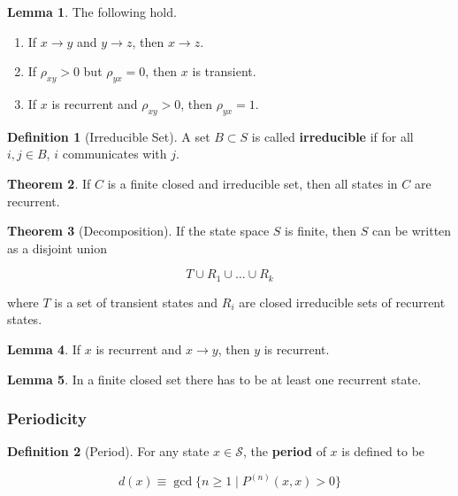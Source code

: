 \documentclass{article}
\theoremstyle{definition}
\newtheorem{theorem}{Theorem}[section]
\newtheorem{lemma}[theorem]{Lemma}
\theoremstyle{remark}
\theoremstyle{definition}
\newtheorem{definition}{Definition}[section]
\begin{document}
      \begin{lemma}
        The following hold. 

        \begin{enumerate}
          \item If $x \rightarrow y$ and $y \rightarrow z$, then $x \rightarrow z$. 
          \item If $\rho_{xy} > 0$ but $\rho_{yx} = 0$, then $x$ is transient.  
          \item If $x$ is recurrent and $\rho_{xy} > 0$, then $\rho_{yx} = 1$. 
        \end{enumerate}
      \end{lemma}

      \begin{definition}[Irreducible Set]
        A set $B \subset S$ is called \textbf{irreducible} if for all $i, j \in B$, $i$ communicates with $j$. 
      \end{definition}

      \begin{theorem}
        If $C$ is a finite closed and irreducible set, then all states in $C$ are recurrent. 
      \end{theorem}

      \begin{theorem}[Decomposition]
        If the state space $S$ is finite, then $S$ can be written as a disjoint union 

          \[T \cup R_1 \cup \ldots \cup R_k\]

        where $T$ is a set of transient states and $R_i$ are closed irreducible sets of recurrent states. 
      \end{theorem}

      \begin{lemma}
        If $x$ is recurrent and $x \rightarrow y$, then $y$ is recurrent. 
      \end{lemma}

      \begin{lemma}
        In a finite closed set there has to be at least one recurrent state. 
      \end{lemma}

    \subsubsection{Periodicity}

      \begin{definition}[Period]
        For any state $x \in \mathcal{S}$, the \textbf{period} of $x$ is defined to be

          \[d(x) \equiv \gcd \{n \geq 1 \; | \; P^{(n)} (x, x) > 0\}\]
      \end{definition}
\end{document}
